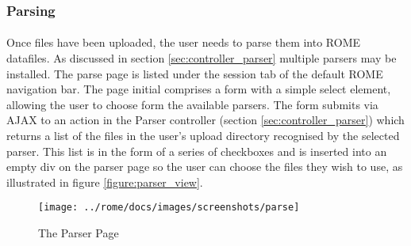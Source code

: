 \subsubsection{Parsing}
\label{sec:view_parse}

\paragraph{}
Once files have been uploaded, the user needs to parse them into ROME datafiles. As discussed in section \ref{sec:controller_parser} multiple parsers may be installed. The parse page is listed under the session tab of the default ROME navigation bar. The page initial comprises a form with a simple select element, allowing the user to choose form the available parsers. The form submits via AJAX to an action in the Parser controller (section \ref{sec:controller_parser}) which returns a list of the files in the user's upload directory recognised by the selected parser. This list is in the form of a series of checkboxes and is inserted into an empty div on the parser page so the user can choose the files they wish to use, as illustrated in figure \ref{figure:parser_view}.


\begin{figure}[h]
\centering
\texttt{[image: ../rome/docs/images/screenshots/parse]}
\caption{The Parser Page}\label{fig:parser_view}
\end{figure}

\clearpage
